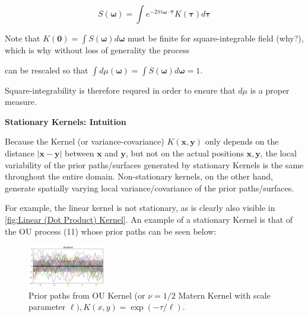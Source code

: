 \documentclass[11pt]{article}
\theoremstyle{plain} %
\theoremstyle{remark}
\begin{document}
$$
  S(\boldsymbol{\omega})=\int e^{-2 \pi i \boldsymbol{\omega} \cdot \boldsymbol{\tau}} K(\boldsymbol{\tau}) d \boldsymbol{\tau}
$$

Note that $K(\mathbf{0})=\int S(\boldsymbol{\omega}) d \boldsymbol{\omega}$ must
be finite for square-integrable field (why?), which is why without loss of
generality the process

can be rescaled so that $\int d \mu(\boldsymbol{\omega})=\int
  S(\boldsymbol{\omega}) d \boldsymbol{\omega}=1$.

Square-integrability is therefore requred in order to ensure that $d \mu$ is a
proper measure.

\textbf{Stationary Kernels: Intuition}

Because the Kernel (or variance-covariance) $K(\mathbf{x}, \mathbf{y})$ only
depends on the distance $|\mathbf{x}-\mathbf{y}|$ between $\mathbf{x}$ and
$\mathbf{y}$, but not on the actual positions $\mathbf{x}, \mathbf{y}$, the
local variability of the prior paths/surfaces generated by stationary Kernels is
the same throughout the entire domain. Non-stationary kernels, on the other
hand, generate spatially varying local variance/covariance of the prior
paths/surfaces.

For example, the linear kernel is not stationary, as is clearly also visible in
\cref{fig:Linear (Dot Product) Kernel}. An example of a stationary Kernel is that of the OU process (11) whose prior
paths can be seen below:

\begin{figure}[!htp]
  \centering
  \includegraphics[width=0.3\textwidth]{images/2023_11_26_5b299dbd302e8f129737g-55}
  \caption{Prior paths from OU Kernel (or $\nu=1 / 2$ Matern Kernel with scale
    parameter $\ell), K(x, y)=\exp (-\tau / \ell)$.}
  \label{fig:stationary Matern kernel}
\end{figure}
\end{document}
